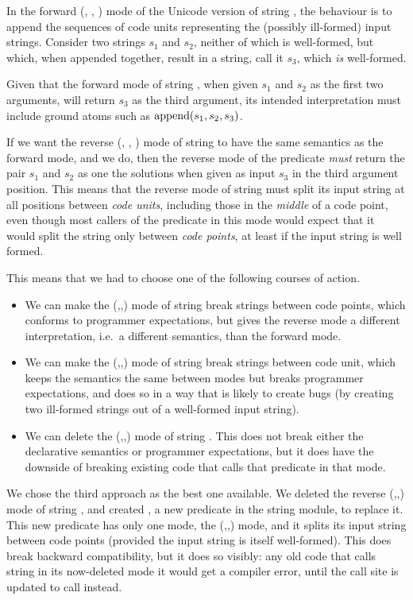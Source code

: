In the forward (, , ) mode
of the Unicode version of string ,
the behaviour is to append the sequences of code units representing
the (possibly ill-formed) input strings.
Consider two strings $s_1$ and $s_2$,
neither of which is well-formed,
but which, when appended together, result in a string,
call it $s_3$, which \emph{is} well-formed.

Given that the forward mode of string ,
when given $s_1$ and $s_2$ as the first two arguments,
will return $s_3$ as the third argument,
its intended interpretation
must include ground atoms such as $\operatorname{append}(s_1, s_2, s_3)$.

If we want the reverse (, , ) mode
of string 
to have the same semantics as the forward mode, and we do,
then the reverse mode of the predicate
\emph{must} return the pair $s_1$ and $s_2$ as one the solutions
when given as input $s_3$ in the third argument position.
This means that the reverse mode of string 
must split its input string
at all positions between \emph{code units},
including those in the \emph{middle} of a code point,
even though most callers of the predicate in this mode
would expect that it would split the string only between \emph{code points},
at least if the input string is well formed.

This means that we had to choose one of the following courses of action.
\begin{itemize}
\item
We can make the (,,) mode
of string 
break strings between code points,
which conforms to programmer expectations,
but gives the reverse mode a different interpretation,
i.e.\ a different semantics, than the forward mode.
\item
We can make the (,,) mode
of string 
break strings between code unit,
which keeps the semantics the same between modes
but breaks programmer expectations,
and does so in a way that is likely to create bugs
(by creating two ill-formed strings out of a well-formed input string).
\item
We can delete the (,,) mode
of string .
This does not break either the declarative semantics
or programmer expectations,
but it does have the downside of breaking existing code
that calls that predicate in that mode.
\end{itemize}

We chose the third approach as the best one available.
We deleted the reverse (,,) mode
of string ,
and created ,
a new predicate in the string module,
to replace it.
This new predicate has only one mode,
the (,,) mode,
and it splits its input string between code points
(provided the input string is itself well-formed).
This does break backward compatibility, but it does so visibly:
any old code that calls string 
in its now-deleted mode it would get a compiler error,
until the call site is updated to call  instead.


